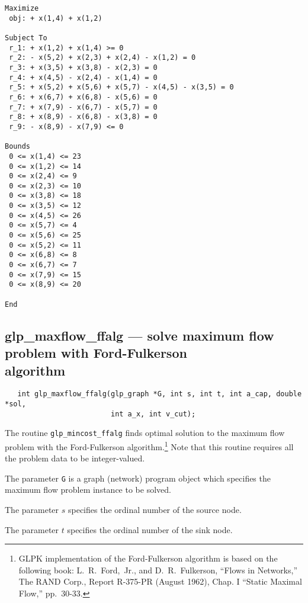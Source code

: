 \documentclass[11pt]{report}
\def\para#1{\noindent{\bf#1}}
\def\synopsis{\para{Synopsis}}
\def\description{\para{Description}}
\begin{document}
\newpage

\begin{footnotesize}
\begin{verbatim}
Maximize
 obj: + x(1,4) + x(1,2)

Subject To
 r_1: + x(1,2) + x(1,4) >= 0
 r_2: - x(5,2) + x(2,3) + x(2,4) - x(1,2) = 0
 r_3: + x(3,5) + x(3,8) - x(2,3) = 0
 r_4: + x(4,5) - x(2,4) - x(1,4) = 0
 r_5: + x(5,2) + x(5,6) + x(5,7) - x(4,5) - x(3,5) = 0
 r_6: + x(6,7) + x(6,8) - x(5,6) = 0
 r_7: + x(7,9) - x(6,7) - x(5,7) = 0
 r_8: + x(8,9) - x(6,8) - x(3,8) = 0
 r_9: - x(8,9) - x(7,9) <= 0

Bounds
 0 <= x(1,4) <= 23
 0 <= x(1,2) <= 14
 0 <= x(2,4) <= 9
 0 <= x(2,3) <= 10
 0 <= x(3,8) <= 18
 0 <= x(3,5) <= 12
 0 <= x(4,5) <= 26
 0 <= x(5,7) <= 4
 0 <= x(5,6) <= 25
 0 <= x(5,2) <= 11
 0 <= x(6,8) <= 8
 0 <= x(6,7) <= 7
 0 <= x(7,9) <= 15
 0 <= x(8,9) <= 20

End
\end{verbatim}
\end{footnotesize}

\subsection{glp\_maxflow\_ffalg --- solve maximum flow problem with
Ford-Fulkerson\\algorithm}

\synopsis

\begin{verbatim}
   int glp_maxflow_ffalg(glp_graph *G, int s, int t, int a_cap, double *sol,
                         int a_x, int v_cut);
\end{verbatim}

\description

The routine \verb|glp_mincost_ffalg| finds optimal solution to the
maximum flow problem with the Ford-Fulkerson algorithm.\footnote{GLPK
implementation of the Ford-Fulkerson algorithm is based on the
following book: L.~R.~Ford,~Jr., and D.~R.~Fulkerson, ``Flows in
Networks,'' The RAND Corp., Report R-375-PR (August 1962), Chap. I
``Static Maximal Flow,'' pp.~30-33.} Note that this routine requires
all the problem data to be integer-valued.

The parameter \verb|G| is a graph (network) program object which
specifies the maximum flow problem instance to be solved.

The parameter $s$ specifies the ordinal number of the source node.

The parameter $t$ specifies the ordinal number of the sink node.
\end{document}
